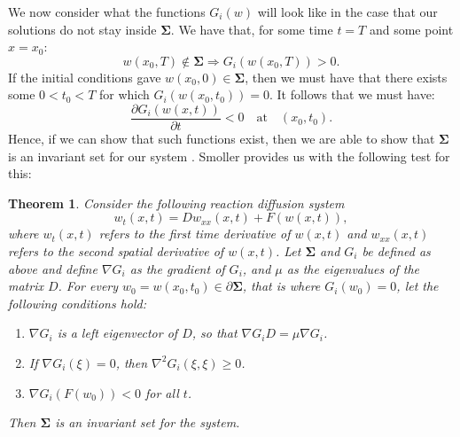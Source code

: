 \documentclass[12pt]{article}
\newtheorem{theorem}{Theorem}[section]
\begin{document}
We now consider what the functions $G_i(w)$ will look like in the case that our solutions do not stay inside $\mathbf{\Sigma}$. We have that, for some time $t=T$ and some point $x = x_0$:
  $$w(x_0,T) \notin \mathbf{\Sigma} \Longrightarrow G_i(w(x_0,T)) > 0.$$
If the initial conditions gave $w(x_0,0) \in \mathbf{\Sigma}$, then we must have that there exists some $0<t_0<T$ for which $G_i (w(x_0,t_0)) = 0$. It follows that we must have:
$$\frac{\partial{G_i(w(x,t))}}{\partial{t}} < 0 \quad \text{at} \quad (x_0,t_0).$$
Hence, if we can show that such functions exist, then we are able to show that $\mathbf{\Sigma}$ is an invariant set for our system \cite{Smoller}. Smoller provides us with the following test for this:
\begin{theorem}
Consider the following reaction diffusion system
$$w_t(x,t) = Dw_{xx}(x,t) + F(w(x,t)),$$
where $w_t(x,t)$ refers to the first time derivative of $w(x,t)$ and $w_{xx}(x,t)$ refers to the second spatial derivative of $w(x,t)$. Let $\mathbf{\Sigma}$ and $G_i$ be defined as above and define $\nabla G_i$ as the gradient of $G_i$, and $\mu$ as the eigenvalues of the matrix $D$.  For every $w_0 = w(x_0,t_0) \in \partial \mathbf{\Sigma}$, that is where $G_i(w_0) = 0$, let the following conditions hold:
\begin{enumerate}
\item [(i)]$\nabla G_i$ is a left eigenvector of $D$, so that $\nabla G_iD = \mu \nabla G_i$.
\item [(ii)] If $\nabla G_i(\xi) = 0$, then $\nabla^2G_i(\xi,\xi) \geq 0$.
\item [(iii)]$\nabla G_i(F(w_0))<0$ for all $t$. 
\end{enumerate}
Then $\mathbf{\Sigma}$ is an invariant set for the system. 
\end{theorem}
\end{document}
